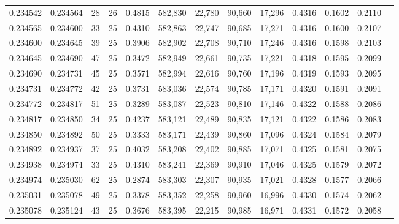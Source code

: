 \begin{tabular}{rrrrrrrrrrrrr}
0.234542 & 0.234564 &    28 &  26 &                                     0.4815 & 582,830 &  22,780 &  90,660 &  17,296 & 0.4316 & 0.1602 & 0.2110 \\
0.234565 & 0.234600 &    33 &  25 &                                     0.4310 & 582,863 &  22,747 &  90,685 &  17,271 & 0.4316 & 0.1600 & 0.2107 \\
0.234600 & 0.234645 &    39 &  25 &                                     0.3906 & 582,902 &  22,708 &  90,710 &  17,246 & 0.4316 & 0.1598 & 0.2103 \\
0.234645 & 0.234690 &    47 &  25 &                                     0.3472 & 582,949 &  22,661 &  90,735 &  17,221 & 0.4318 & 0.1595 & 0.2099 \\
0.234690 & 0.234731 &    45 &  25 &                                     0.3571 & 582,994 &  22,616 &  90,760 &  17,196 & 0.4319 & 0.1593 & 0.2095 \\
0.234731 & 0.234772 &    42 &  25 &                                     0.3731 & 583,036 &  22,574 &  90,785 &  17,171 & 0.4320 & 0.1591 & 0.2091 \\
0.234772 & 0.234817 &    51 &  25 &                                     0.3289 & 583,087 &  22,523 &  90,810 &  17,146 & 0.4322 & 0.1588 & 0.2086 \\
0.234817 & 0.234850 &    34 &  25 &                                     0.4237 & 583,121 &  22,489 &  90,835 &  17,121 & 0.4322 & 0.1586 & 0.2083 \\
0.234850 & 0.234892 &    50 &  25 &                                     0.3333 & 583,171 &  22,439 &  90,860 &  17,096 & 0.4324 & 0.1584 & 0.2079 \\
0.234892 & 0.234937 &    37 &  25 &                                     0.4032 & 583,208 &  22,402 &  90,885 &  17,071 & 0.4325 & 0.1581 & 0.2075 \\
0.234938 & 0.234974 &    33 &  25 &                                     0.4310 & 583,241 &  22,369 &  90,910 &  17,046 & 0.4325 & 0.1579 & 0.2072 \\
0.234974 & 0.235030 &    62 &  25 &                                     0.2874 & 583,303 &  22,307 &  90,935 &  17,021 & 0.4328 & 0.1577 & 0.2066 \\
0.235031 & 0.235078 &    49 &  25 &                                     0.3378 & 583,352 &  22,258 &  90,960 &  16,996 & 0.4330 & 0.1574 & 0.2062 \\
0.235078 & 0.235124 &    43 &  25 &                                     0.3676 & 583,395 &  22,215 &  90,985 &  16,971 & 0.4331 & 0.1572 & 0.2058 \\

\end{tabular}
